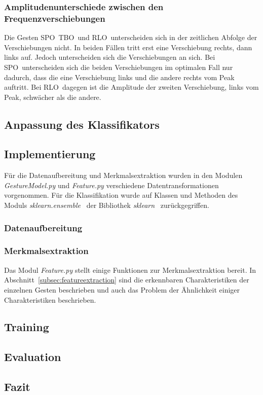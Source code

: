 \subsubsection*{Amplitudenunterschiede zwischen den Frequenzverschiebungen}
Die Gesten \glqq \acl{SPO}\grqq\, \glqq \acl{TBO}\grqq\ und \glqq \acl{RLO}\grqq\ unterscheiden sich in der zeitlichen Abfolge der Verschiebungen nicht. In beiden Fällen tritt erst eine Verschiebung rechts, dann links auf. Jedoch unterscheiden sich die Verschiebungen an sich. Bei \glqq \acl{SPO}\grqq\ unterscheiden sich die beiden Verschiebungen im optimalen Fall nur dadurch, dass die eine Verschiebung links und die andere rechts vom Peak auftritt. Bei \glqq \acl{RLO}\grqq\ dagegen ist die Amplitude der zweiten Verschiebung, links vom Peak, schwächer als die andere.

\subsection{Anpassung des Klassifikators}

\subsection{Implementierung}

Für die Datenaufbereitung und Merkmalsextraktion wurden in den Modulen \textit{GestureModel.py} und \textit{Feature.py} verschiedene Datentransformationen vorgenommen. Für die Klassifikation wurde auf Klassen und Methoden des Moduls \textit{sklearn.ensemble}~\cite{sklearn.ensemble} der Bibliothek \textit{sklearn}~\cite{sklearn} zurückgegriffen.

\subsubsection{Datenaufbereitung}


\subsubsection{Merkmalsextraktion}
Das Modul \textit{Feature.py} stellt einige Funktionen zur Merkmalsextraktion bereit. In Abschnitt~\ref{subsec:featureextraction} sind die erkennbaren Charakteristiken der einzelnen Gesten beschrieben und auch das Problem der Ähnlichkeit einiger Charakteristiken beschrieben. 


\subsection{Training}

\subsection{Evaluation}

\subsection{Fazit}


